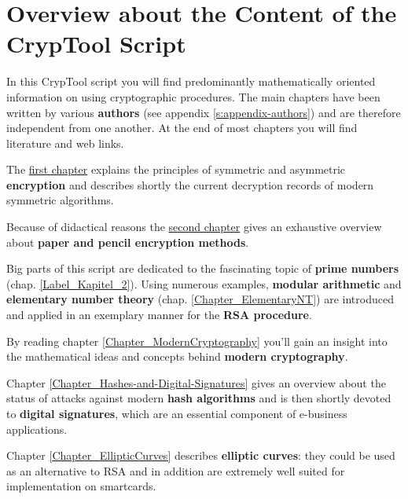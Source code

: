 
\chapter*{Overview about the Content of the CrypTool Script}  

\parskip 4pt
{
\noindent In this CrypTool script you will find predominantly
mathematically oriented information on using cryptographic procedures.
The main chapters have been written by various
{\bf authors} (see appendix \ref{s:appendix-authors})
and are therefore independent from one another. At the end of most chapters
you will find literature and web links.

The \hyperlink{Kapitel_1}{first chapter} explains the principles of symmetric
and asymmetric {\bf encryption} and describes shortly the current decryption
records of modern symmetric algorithms.

Because of didactical reasons the \hyperlink{Kapitel_PaperandPencil}
{second chapter} gives an exhaustive overview
about {\bf paper and pencil encryption methods}.

Big parts of this script are dedicated to the fascinating topic of 
{\bf prime numbers} (chap. \ref{Label_Kapitel_2}).
Using numerous examples,
{\bf modular arithmetic} and 
{\bf elementary number theory} (chap. \ref{Chapter_ElementaryNT})
are introduced and applied in an exemplary manner for the {\bf RSA procedure}.

By reading chapter \ref{Chapter_ModernCryptography}
you'll gain an insight into the mathematical ideas and concepts behind 
{\bf modern cryptography}.

Chapter \ref{Chapter_Hashes-and-Digital-Signatures} gives
an overview about the status of attacks against modern {\bf hash algorithms}
and is then shortly devoted to {\bf digital signatures}, 
which are an essential component of e-business applications.

Chapter \ref{Chapter_EllipticCurves} describes {\bf elliptic curves}:
they could be used as an alternative to RSA and in addition are extremely
well suited for implementation on smartcards.

}
